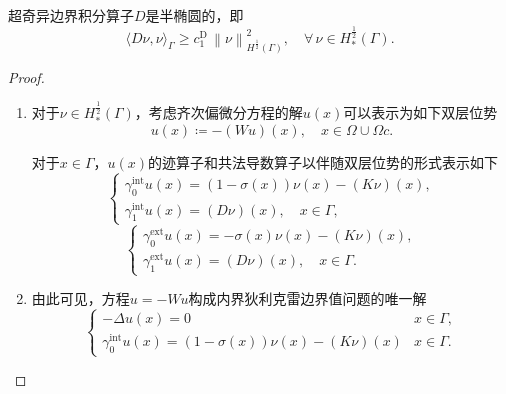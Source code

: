\begin{theorem}[超奇异边界积分算子的半椭圆性]
\label{theorem:bvp-bie-hyper-semi-ellipticity}
  超奇异边界积分算子$D$是半椭圆的，即
  \begin{equation*}
    \langle D \nu, \nu \rangle_{\Gamma} \ge c_{1}^{\text{D}} \,
    \left\| \nu \right\|_{H^{\frac{1}{2}}(\Gamma)}^{2}, \quad \forall \, \nu \in H_{*}^{\frac{1}{2}}(\Gamma).
  \end{equation*}
\end{theorem}
\begin{proof}
  \begin{enumerate}
  \item 对于$\nu \in H_{*}^{\frac{1}{2}}(\Gamma)$，考虑齐次偏微分方程的解$u(x)$可以表示为如下双层位势
  \begin{equation*}
    u(x) \coloneqq - \left( W u \right)(x) , \quad x \in \Omega \cup \Omega{c}.
  \end{equation*}

  对于$x \in \Gamma$，$u(x)$的迹算子和共法导数算子以伴随双层位势的形式表示如下
  \begin{equation*}
    \begin{cases}
      \gamma_{0}^{\text{int}} u(x) = \left( 1 - \sigma(x) \right)
      \nu(x) - \left( K \nu \right)(x), \\
      \gamma_{1}^{\text{int}} u(x) = \left( D \nu \right) (x), \quad x \in \Gamma,
    \end{cases}
  \end{equation*}
  \begin{equation*}
    \begin{cases}
      \gamma_{0}^{\text{ext}} u(x) = - \sigma(x)
      \nu(x) - \left( K \nu \right)(x), \\
      \gamma_{1}^{\text{ext}} u(x) = \left( D \nu \right) (x), \quad x \in \Gamma.
    \end{cases}
  \end{equation*}

\item 由此可见，方程$u = -W u$构成内界狄利克雷边界值问题的唯一解
\begin{equation*}
  \begin{cases}
    - \Delta u(x) = 0 & x \in \Gamma, \\
    \gamma_{0}^{\text{int}} u(x) = \left( 1- \sigma(x) \right)\nu(x) - \left( K \nu \right)(x) & x \in \Gamma.
  \end{cases}
\end{equation*}


\end{enumerate}
\end{proof}
